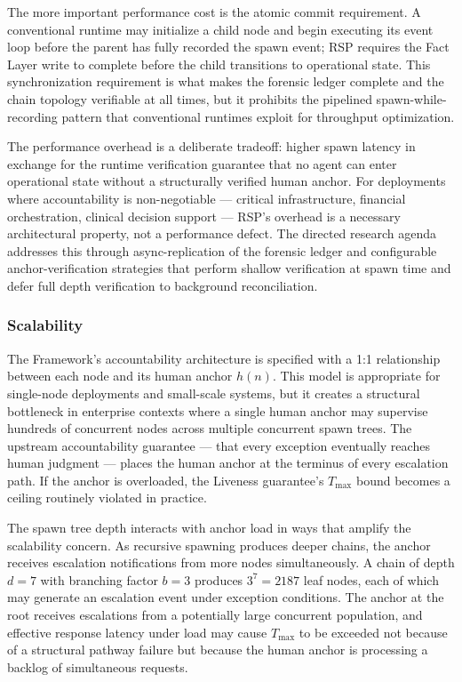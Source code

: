 The more important performance cost is the atomic commit requirement. A conventional runtime may initialize a child node and begin executing its event loop before the parent has fully recorded the spawn event; RSP requires the Fact Layer write to complete before the child transitions to operational state. This synchronization requirement is what makes the forensic ledger complete and the chain topology verifiable at all times, but it prohibits the pipelined spawn-while-recording pattern that conventional runtimes exploit for throughput optimization.

The performance overhead is a deliberate tradeoff: higher spawn latency in exchange for the runtime verification guarantee that no agent can enter operational state without a structurally verified human anchor. For deployments where accountability is non-negotiable — critical infrastructure, financial orchestration, clinical decision support — RSP's overhead is a necessary architectural property, not a performance defect. The directed research agenda addresses this through async-replication of the forensic ledger and configurable anchor-verification strategies that perform shallow verification at spawn time and defer full depth verification to background reconciliation.

\subsubsection{Scalability}\label{sec:rs-limitations:scalability}

The \bxthree{} Framework's accountability architecture is specified with a 1:1 relationship between each node and its human anchor $h(n)$. This model is appropriate for single-node deployments and small-scale systems, but it creates a structural bottleneck in enterprise contexts where a single human anchor may supervise hundreds of concurrent nodes across multiple concurrent spawn trees. The upstream accountability guarantee — that every exception eventually reaches human judgment — places the human anchor at the terminus of every escalation path. If the anchor is overloaded, the Liveness guarantee's $T_{\max}$ bound becomes a ceiling routinely violated in practice.

The spawn tree depth interacts with anchor load in ways that amplify the scalability concern. As recursive spawning produces deeper chains, the anchor receives escalation notifications from more nodes simultaneously. A chain of depth $d = 7$ with branching factor $b = 3$ produces $3^7 = 2187$ leaf nodes, each of which may generate an escalation event under exception conditions. The anchor at the root receives escalations from a potentially large concurrent population, and effective response latency under load may cause $T_{\max}$ to be exceeded not because of a structural pathway failure but because the human anchor is processing a backlog of simultaneous requests.

